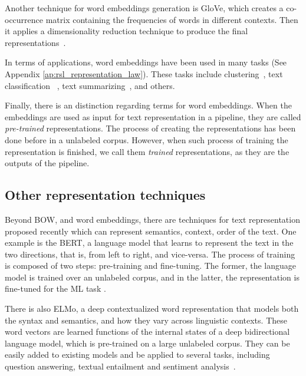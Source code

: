 Another technique for word embeddings generation is GloVe, which creates a co-occurrence matrix containing the frequencies of words in different contexts. Then it applies a dimensionality reduction technique to produce the final representations~\cite{Pennington2014}.


In terms of applications, word embeddings have been  used in many tasks (See Appendix \ref{ap:rsl_representation_law}).  These tasks include clustering~\cite{Mohammed2020}, text classification~\cite{Aggarwal2018} , text summarizing~\cite{Alami2019195}, and others.

Finally, there is an distinction regarding terms for word embeddings.  When the embeddings are used as input for text representation in a pipeline, they are called \textit{pre-trained} representations. The process of creating  the representations has been done before in a unlabeled corpus. However, when such process of training the representation is finished, we call them \textit{trained} representations, as they are the outputs of the pipeline.  


\subsection{Other representation techniques}

Beyond \gls{BOW}, and word embeddings, there are techniques for text representation proposed recently which can represent semantics, context, order of the text. One example is the \gls{BERT}, a language model that  learns to represent the text in the two directions, that is, from left to right, and vice-versa. The process of training is composed of two steps: pre-training and fine-tuning. The former, the language model is trained over an unlabeled corpus, and in the latter, the representation is fine-tuned for the \gls{ML} task \cite{Devlin2018}.

There is also \gls{ELMo}, a deep contextualized word representation that models both the  syntax and semantics, and how they vary across linguistic contexts. These word vectors are learned functions of the internal states of a deep bidirectional language model, which is pre-trained on a large unlabeled corpus. They can be easily added to existing models and be applied to several tasks, including question answering, textual entailment and sentiment analysis~\cite{Peters2018}.

